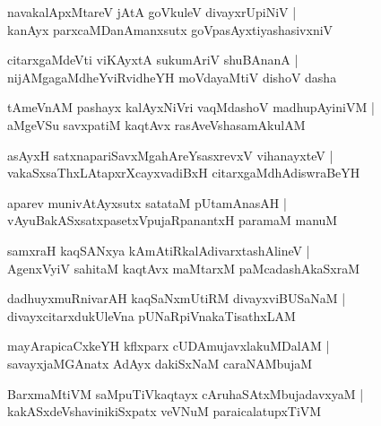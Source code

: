 \documentclass[twoside,12pt,openright]{book}
\newcounter{shloka}[chapter]
\begin{document}
\begin{shloka}%
navakalApxMtareV jAtA goVkuleV divayxrUpiNiV |\\
kanAyx parxcaMDanAmanxsutx goVpasAyxtiyashasivxniV 
\end{shloka}

\begin{shloka}%
citarxgaMdeVti viKAyxtA sukumAriV shuBAnanA |\\
nijAMgagaMdheYviRvidheYH moVdayaMtiV dishoV dasha
\end{shloka}

\begin{shloka}%
tAmeVnAM pashayx kalAyxNiVri vaqMdashoV madhupAyiniVM |\\
aMgeVSu savxpatiM kaqtAvx rasAveVshasamAkulAM 
\end{shloka}

\begin{shloka}%
asAyxH satxnapariSavxMgahAreYsasxrevxV vihanayxteV |\\
vakaSxsaThxLAtapxrXcayxvadiBxH citarxgaMdhAdiswraBeYH
\end{shloka}

\begin{shloka}%
aparev munivAtAyxsutx satataM pUtamAnasAH |\\
vAyuBakASxsatxpasetxVpujaRpanantxH paramaM manuM 
\end{shloka}

\begin{shloka}%
samxraH kaqSANxya kAmAtiRkalAdivarxtashAlineV |\\
AgenxVyiV sahitaM kaqtAvx maMtarxM paMcadashAkaSxraM 
\end{shloka}

\begin{shloka}%
dadhuyxmuRnivarAH kaqSaNxmUtiRM divayxviBUSaNaM |\\
divayxcitarxdukUleVna pUNaRpiVnakaTisathxLAM 
\end{shloka}

\begin{shloka}%
mayArapicaCxkeYH kflxparx cUDAmujavxlakuMDalAM |\\
savayxjaMGAnatx AdAyx dakiSxNaM caraNAMbujaM 
\end{shloka}

\begin{shloka}%
BarxmaMtiVM saMpuTiVkaqtayx cAruhaSAtxMbujadavxyaM |\\
kakASxdeVshavinikiSxpatx veVNuM paraicalatupxTiVM 
\end{shloka}
\end{document}
